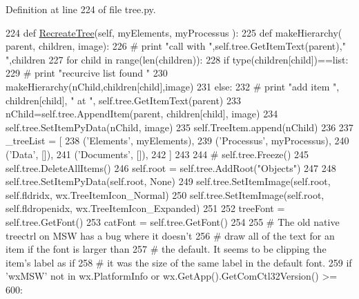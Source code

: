 Definition at line 224 of file tree.\+py.


\begin{DoxyCode}
224     \textcolor{keyword}{def }\hyperlink{namespacetree_af52f98081d696417bca581a778074e7a}{RecreateTree}(self, myElements, myProcessus ):
225         \textcolor{keyword}{def }makeHierarchy( parent, children, image):
226 \textcolor{comment}{#            print "call with ",self.tree.GetItemText(parent)," ",children }
227             \textcolor{keywordflow}{for} child \textcolor{keywordflow}{in} range(len(children)):
228                 \textcolor{keywordflow}{if} type(children[child])==list:
229 \textcolor{comment}{#                    print "recurcive list found "}
230                     makeHierarchy(nChild,children[child],image)
231                 \textcolor{keywordflow}{else}:
232 \textcolor{comment}{#                    print "add item ", children[child], " at ", self.tree.GetItemText(parent)             
             }
233                     nChild=self.tree.AppendItem(parent, children[child], image)
234                     self.tree.SetItemPyData(nChild, image)
235                     self.TreeItem.append(nChild)            
236 
237         \_treeList = [
238                      (\textcolor{stringliteral}{'Elements'},  myElements),
239                      (\textcolor{stringliteral}{'Processus'}, myProcessus),
240                      (\textcolor{stringliteral}{'Data'},      []),
241                      (\textcolor{stringliteral}{'Documents'}, []),
242                      ]
243 
244 \textcolor{comment}{#        self.tree.Freeze()}
245         self.tree.DeleteAllItems()
246         self.root = self.tree.AddRoot(\textcolor{stringliteral}{"Objects"})
247 
248         self.tree.SetItemPyData(self.root, \textcolor{keywordtype}{None})
249         self.tree.SetItemImage(self.root, self.fldridx, wx.TreeItemIcon\_Normal)
250         self.tree.SetItemImage(self.root, self.fldropenidx, wx.TreeItemIcon\_Expanded)
251 
252         treeFont = self.tree.GetFont()
253         catFont = self.tree.GetFont()
254 
255         \textcolor{comment}{# The old native treectrl on MSW has a bug where it doesn't}
256         \textcolor{comment}{# draw all of the text for an item if the font is larger than}
257         \textcolor{comment}{# the default.  It seems to be clipping the item's label as if}
258         \textcolor{comment}{# it was the size of the same label in the default font.}
259         \textcolor{keywordflow}{if} \textcolor{stringliteral}{'wxMSW'} \textcolor{keywordflow}{not} \textcolor{keywordflow}{in} wx.PlatformInfo \textcolor{keywordflow}{or} wx.GetApp().GetComCtl32Version() >= 600:

\end{DoxyCode}

